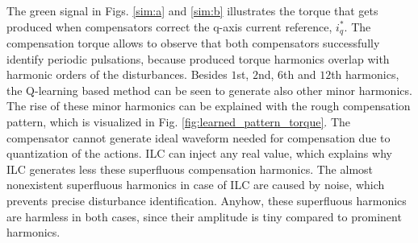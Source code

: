 The green signal in Figs. \ref{sim:a} and \ref{sim:b} illustrates the torque that gets produced when compensators correct the q-axis current reference, $i_q^*$. The compensation torque allows to observe that both compensators successfully identify periodic pulsations, because produced torque harmonics overlap with harmonic orders of the disturbances. Besides $1$st, $2$nd, $6$th and $12$th harmonics, the Q-learning based method can be seen to generate also other minor harmonics. The rise of these minor harmonics can be explained with the rough compensation pattern, which is visualized in Fig. \ref{fig:learned_pattern_torque}. The compensator cannot generate ideal waveform needed for compensation due to quantization of the actions. ILC can inject any real value, which explains why ILC generates less these superfluous compensation harmonics. The almost nonexistent superfluous harmonics in case of ILC are caused by noise, which prevents precise disturbance identification. Anyhow, these superfluous harmonics are harmless in both cases, since their amplitude is tiny compared to prominent harmonics.

